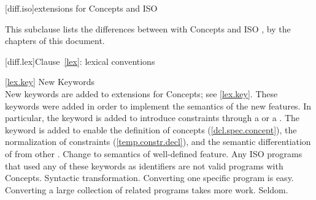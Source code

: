 
[diff.iso]{\Cpp extensions for Concepts and ISO }

\pnum
This subclause lists the differences between \Cpp with Concepts
and ISO \Cpp, by the chapters of this document.

[diff.lex]{Clause~\ref{lex}: lexical conventions}

\ref{lex.key}
\change New Keywords\\
New keywords are added to \Cpp extensions for Concepts;
see \ref{lex.key}.
\rationale
These keywords were added in order to implement the semantics of the
new features. In particular, the  keyword is added
to introduce constraints through a  or
a . The  keyword is
added to enable the definition of concepts (\ref{dcl.spec.concept}),
the normalization of constraints (\ref{temp.constr.decl}), and the 
semantic differentiation of  from other
.
\effect
Change to semantics of well-defined feature.
Any ISO \Cpp programs that used any of these keywords as identifiers
are not valid \Cpp programs with Concepts.
\difficulty
Syntactic transformation.
Converting one specific program is easy.
Converting a large collection
of related programs takes more work.
\howwide
Seldom.

